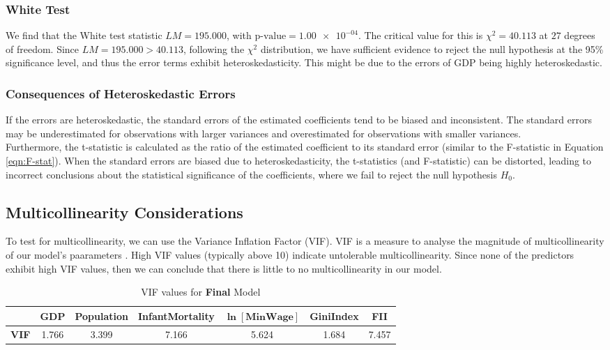 \documentclass{article}
\begin{document}
\subsubsection{White Test}
We find that the White test statistic $LM = 195.000$, with $\text{p-value} = \num{1.00e-04}$. The critical value for this is $\chi^2 = 40.113$ at $27$ degrees of freedom. Since $LM = 195.000 > 40.113$, following the $\chi^2$ distribution, we have sufficient evidence to reject the null hypothesis at the 95\% significance level, and thus the error terms exhibit heteroskedasticity. This might be due to the errors of GDP being highly heteroskedastic.

\subsubsection{Consequences of Heteroskedastic Errors}
If the errors are heteroskedastic, the standard errors of the estimated coefficients tend to be biased and inconsistent.
The standard errors may be underestimated for observations with larger variances and overestimated for observations with smaller variances. \\

\noindent Furthermore, the t-statistic is calculated as the ratio of the estimated coefficient to its standard error (similar to the F-statistic in Equation \ref{eqn:F-stat}). When the standard errors are biased due to heteroskedasticity, the t-statistics (and F-statistic) can be distorted, leading to incorrect
conclusions about the statistical significance of the coefficients, where we fail to reject the null hypothesis $H_0$.

\subsection{Multicollinearity Considerations}
To test for multicollinearity, we can use the Variance Inflation Factor (VIF). VIF is a measure to analyse the magnitude of multicollinearity of our model's paarameters \cite{James2013}. High VIF values (typically above 10) indicate untolerable multicollinearity. Since none of the predictors exhibit high VIF values, then we can conclude that there is little to no multicollinearity in our model.

\begin{table}[H]
    \centering
        \begin{threeparttable}
            \begin{tabular}{c c c c c c c}
              \toprule & \textbf{GDP} & \textbf{Population} & \textbf{InfantMortality} & \textbf{$\bm{\ln{[\text{MinWage}]}}$} & \textbf{GiniIndex} & \textbf{FII} \\ \midrule 
            \textbf{VIF} & 1.766 & 3.399 & 7.166 & 5.624 & 1.684 & 7.457 \\ \bottomrule
            \end{tabular}
        \end{threeparttable}
    \caption{\label{table: viftable}VIF values for \textbf{Final} Model}
\end{table}
\end{document}
